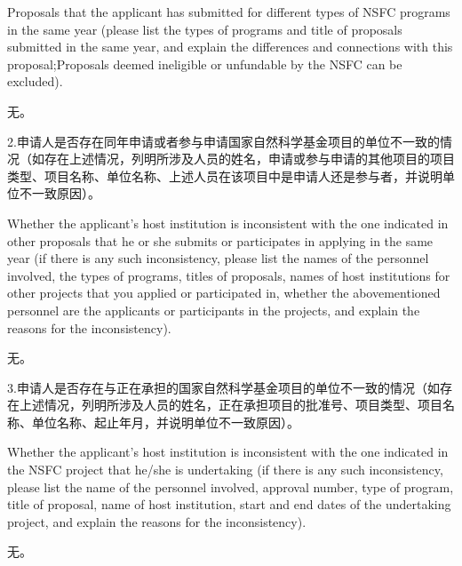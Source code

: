 \documentclass[12pt,UTF8,AutoFakeBold=4,a4paper]{ctexart}
\begin{document}
\bigskip

{\color{MsBlue} \xiaosihao {} 
Proposals that the applicant has submitted for different types of NSFC programs in the same year (please list the types of programs and title of proposals submitted in the same year, and explain the differences and connections with this proposal;Proposals deemed ineligible or unfundable by the NSFC can be excluded).}

\bigskip

无。

\bigskip

{\sihao \color{MsBlue} \kaishu 2.申请人是否存在同年申请或者参与申请国家自然科学基金项目的单位不一致的情况（如存在上述情况，列明所涉及人员的姓名，申请或参与申请的其他项目的项目类型、项目名称、单位名称、上述人员在该项目中是申请人还是参与者，并说明单位不一致原因）。}

\bigskip

{\color{MsBlue} \xiaosihao {} 
Whether the applicant's host institution is inconsistent with the one indicated in other proposals that he or she submits or participates in applying in the same year (if there is any such inconsistency, please list the names of the personnel involved, the types of programs, titles of proposals, names of host institutions for other projects that you applied or participated in, whether the abovementioned personnel are the applicants or participants in the projects, and explain the reasons for the inconsistency).}

\bigskip

无。

\bigskip

{\sihao \color{MsBlue} \kaishu 3.申请人是否存在与正在承担的国家自然科学基金项目的单位不一致的情况（如存在上述情况，列明所涉及人员的姓名，正在承担项目的批准号、项目类型、项目名称、单位名称、起止年月，并说明单位不一致原因）。}

\bigskip

{\color{MsBlue} \xiaosihao {} 
Whether the applicant's host institution is inconsistent with the one indicated in the NSFC project that he/she is undertaking (if there is any such inconsistency, please list the name of the personnel involved, approval number, type of program, title of proposal, name of host institution, start and end dates of the undertaking project, and explain the reasons for the inconsistency).}

\bigskip

无。
\end{document}
